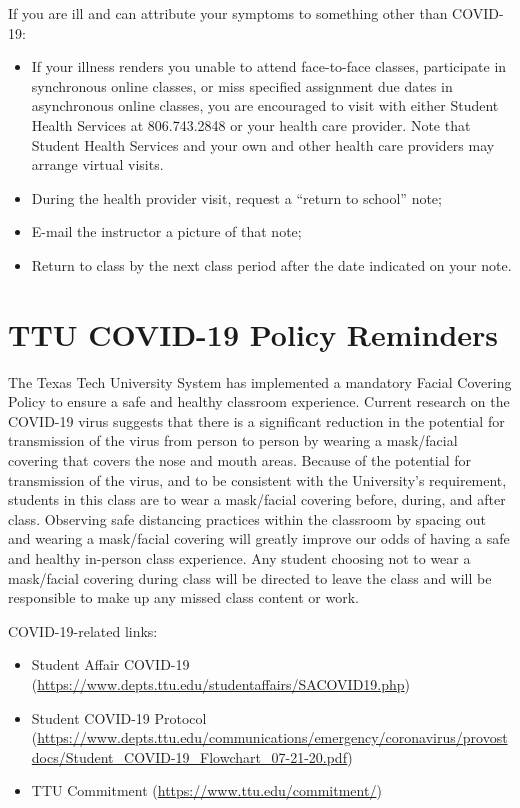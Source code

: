 \documentclass[12pt, notitlepage]{article}   	%
\begin{document}
{If you are ill and can attribute your symptoms to something other than COVID-19:
\begin{itemize}
	\item{If your illness renders you unable to attend face-to-face classes, participate 
	in synchronous online classes, or miss specified assignment due dates in asynchronous 
	online classes, you are encouraged to visit with either Student Health Services at 
	806.743.2848 or your health care provider.  Note that Student Health Services and 
	your own and other health care providers may arrange virtual visits.}
	\item{During the health provider visit, request a “return to school” note;}
	\item{E-mail the instructor a picture of that note;}
	\item{Return to class by the next class period after the date indicated on your note.}
\end{itemize}

\section{TTU COVID-19 Policy Reminders}
The Texas Tech University System has implemented a mandatory Facial Covering Policy to 
ensure a safe and healthy classroom experience. Current research on the COVID-19 virus 
suggests that there is a significant reduction in the potential for transmission of the 
virus from person to person by wearing a mask/facial covering that covers the nose and 
mouth areas. Because of the potential for transmission of the virus, and to be consistent 
with the University’s requirement, students in this class are to wear a mask/facial 
covering before, during, and after class. Observing safe distancing practices within 
the classroom by spacing out and wearing a mask/facial covering will greatly improve 
our odds of having a safe and healthy in-person class experience. Any student choosing 
not to wear a mask/facial covering during class will be directed to leave the class and 
will be responsible to make up any missed class content or work.

COVID-19-related links:
\begin{itemize}
	\item{Student Affair COVID-19 (\url{https://www.depts.ttu.edu/studentaffairs/SACOVID19.php})}
	\item{Student COVID-19 Protocol (\url{https://www.depts.ttu.edu/communications/emergency/coronavirus/provostdocs/Student_COVID-19_Flowchart_07-21-20.pdf})}
	\item{TTU Commitment (\url{https://www.ttu.edu/commitment/})}
\end{itemize}

}
\end{document}
